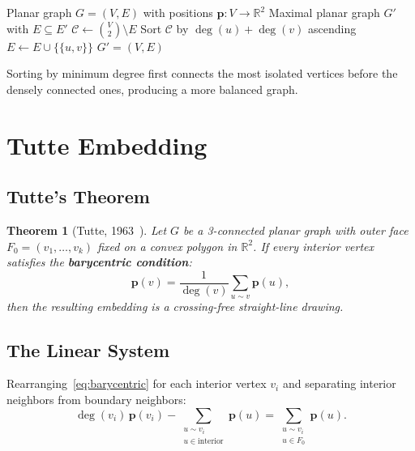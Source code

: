 \documentclass[12pt,letterpaper]{article}
\theoremstyle{plain}
\newtheorem{theorem}{Theorem}[section]
\theoremstyle{definition}
\theoremstyle{remark}
\newcommand{\degr}{\operatorname{deg}}
\begin{document}
\begin{algorithm}[H]
\caption{Constrained maximalization}
\label{alg:maximal}
\begin{algorithmic}[1]
\Require Planar graph $G = (V, E)$ with positions $\mathbf{p}: V \to \mathbb{R}^2$
\Ensure Maximal planar graph $G'$ with $E \subseteq E'$
\State $\mathcal{C} \gets \binom{V}{2} \setminus E$
\State Sort $\mathcal{C}$ by $\degr(u) + \degr(v)$ ascending
        \State $E \gets E \cup \{\{u,v\}\}$
    \EndIf
\EndFor
\State \Return $G' = (V, E)$
\end{algorithmic}
\end{algorithm}

Sorting by minimum degree first connects the most isolated vertices before the
densely connected ones, producing a more balanced graph.

\section{Tutte Embedding}
\label{sec:tutte}

\subsection{Tutte's Theorem}

\begin{theorem}[Tutte, 1963~\cite{tutte1963}]
Let $G$ be a 3-connected planar graph with outer face $F_0 = (v_1, \ldots, v_k)$
fixed on a convex polygon in $\mathbb{R}^2$. If every interior vertex satisfies
the \textbf{barycentric condition}:
\begin{equation}
    \mathbf{p}(v) = \frac{1}{\degr(v)} \sum_{u \sim v} \mathbf{p}(u),
    \label{eq:barycentric}
\end{equation}
then the resulting embedding is a crossing-free straight-line drawing.
\end{theorem}

\subsection{The Linear System}

Rearranging~\eqref{eq:barycentric} for each interior vertex $v_i$ and separating
interior neighbors from boundary neighbors:
\begin{equation}
    \degr(v_i)\, \mathbf{p}(v_i)
    - \sum_{\substack{u \sim v_i \\ u \in \text{interior}}} \mathbf{p}(u)
    = \sum_{\substack{u \sim v_i \\ u \in F_0}} \mathbf{p}(u).
    \label{eq:system}
\end{equation}
\end{document}

